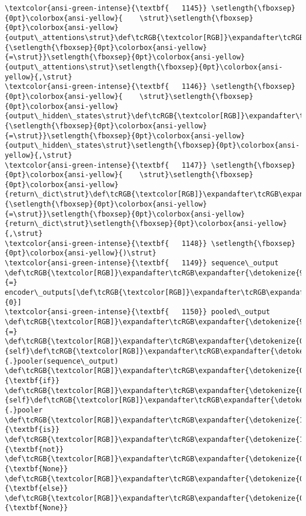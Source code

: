 \documentclass[11pt]{article}
\begin{document}
\begin{Verbatim}[commandchars=\\\{\}, frame=single, framerule=2mm, rulecolor=\color{outerrorbackground}]
\textcolor{ansi-green-intense}{\textbf{   1145}} \setlength{\fboxsep}{0pt}\colorbox{ansi-yellow}{    \strut}\setlength{\fboxsep}{0pt}\colorbox{ansi-yellow}{output\_attentions\strut}\def\tcRGB{\textcolor[RGB]}\expandafter\tcRGB\expandafter{\detokenize{98,98,98}}{\setlength{\fboxsep}{0pt}\colorbox{ansi-yellow}{=\strut}}\setlength{\fboxsep}{0pt}\colorbox{ansi-yellow}{output\_attentions\strut}\setlength{\fboxsep}{0pt}\colorbox{ansi-yellow}{,\strut}
\textcolor{ansi-green-intense}{\textbf{   1146}} \setlength{\fboxsep}{0pt}\colorbox{ansi-yellow}{    \strut}\setlength{\fboxsep}{0pt}\colorbox{ansi-yellow}{output\_hidden\_states\strut}\def\tcRGB{\textcolor[RGB]}\expandafter\tcRGB\expandafter{\detokenize{98,98,98}}{\setlength{\fboxsep}{0pt}\colorbox{ansi-yellow}{=\strut}}\setlength{\fboxsep}{0pt}\colorbox{ansi-yellow}{output\_hidden\_states\strut}\setlength{\fboxsep}{0pt}\colorbox{ansi-yellow}{,\strut}
\textcolor{ansi-green-intense}{\textbf{   1147}} \setlength{\fboxsep}{0pt}\colorbox{ansi-yellow}{    \strut}\setlength{\fboxsep}{0pt}\colorbox{ansi-yellow}{return\_dict\strut}\def\tcRGB{\textcolor[RGB]}\expandafter\tcRGB\expandafter{\detokenize{98,98,98}}{\setlength{\fboxsep}{0pt}\colorbox{ansi-yellow}{=\strut}}\setlength{\fboxsep}{0pt}\colorbox{ansi-yellow}{return\_dict\strut}\setlength{\fboxsep}{0pt}\colorbox{ansi-yellow}{,\strut}
\textcolor{ansi-green-intense}{\textbf{   1148}} \setlength{\fboxsep}{0pt}\colorbox{ansi-yellow}{)\strut}
\textcolor{ansi-green-intense}{\textbf{   1149}} sequence\_output \def\tcRGB{\textcolor[RGB]}\expandafter\tcRGB\expandafter{\detokenize{98,98,98}}{=} encoder\_outputs[\def\tcRGB{\textcolor[RGB]}\expandafter\tcRGB\expandafter{\detokenize{98,98,98}}{0}]
\textcolor{ansi-green-intense}{\textbf{   1150}} pooled\_output \def\tcRGB{\textcolor[RGB]}\expandafter\tcRGB\expandafter{\detokenize{98,98,98}}{=} \def\tcRGB{\textcolor[RGB]}\expandafter\tcRGB\expandafter{\detokenize{0,135,0}}{self}\def\tcRGB{\textcolor[RGB]}\expandafter\tcRGB\expandafter{\detokenize{98,98,98}}{.}pooler(sequence\_output) \def\tcRGB{\textcolor[RGB]}\expandafter\tcRGB\expandafter{\detokenize{0,135,0}}{\textbf{if}} \def\tcRGB{\textcolor[RGB]}\expandafter\tcRGB\expandafter{\detokenize{0,135,0}}{self}\def\tcRGB{\textcolor[RGB]}\expandafter\tcRGB\expandafter{\detokenize{98,98,98}}{.}pooler \def\tcRGB{\textcolor[RGB]}\expandafter\tcRGB\expandafter{\detokenize{175,0,255}}{\textbf{is}} \def\tcRGB{\textcolor[RGB]}\expandafter\tcRGB\expandafter{\detokenize{175,0,255}}{\textbf{not}} \def\tcRGB{\textcolor[RGB]}\expandafter\tcRGB\expandafter{\detokenize{0,135,0}}{\textbf{None}} \def\tcRGB{\textcolor[RGB]}\expandafter\tcRGB\expandafter{\detokenize{0,135,0}}{\textbf{else}} \def\tcRGB{\textcolor[RGB]}\expandafter\tcRGB\expandafter{\detokenize{0,135,0}}{\textbf{None}}


\end{Verbatim}
\end{document}
